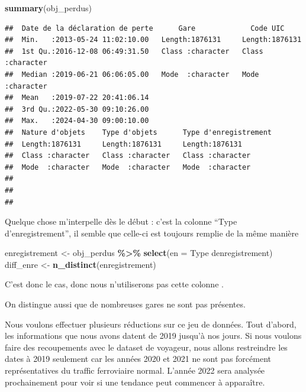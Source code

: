 \documentclass[
]{article}
\newenvironment{Shaded}{\begin{snugshade}}{\end{snugshade}}
\newcommand{\AttributeTok}[1]{\textcolor[rgb]{0.13,0.29,0.53}{#1}}
\newcommand{\FunctionTok}[1]{\textcolor[rgb]{0.13,0.29,0.53}{\textbf{#1}}}
\newcommand{\NormalTok}[1]{#1}
\newcommand{\OtherTok}[1]{\textcolor[rgb]{0.56,0.35,0.01}{#1}}
\newcommand{\SpecialCharTok}[1]{\textcolor[rgb]{0.81,0.36,0.00}{\textbf{#1}}}
\newcommand{\StringTok}[1]{\textcolor[rgb]{0.31,0.60,0.02}{#1}}
\begin{document}
\begin{Shaded}
\begin{Highlighting}[]
\FunctionTok{summary}\NormalTok{(obj\_perdus)}
\end{Highlighting}
\end{Shaded}

\begin{verbatim}
##  Date de la déclaration de perte      Gare             Code UIC        
##  Min.   :2013-05-24 11:02:10.00   Length:1876131     Length:1876131    
##  1st Qu.:2016-12-08 06:49:31.50   Class :character   Class :character  
##  Median :2019-06-21 06:06:05.00   Mode  :character   Mode  :character  
##  Mean   :2019-07-22 20:41:06.14                                        
##  3rd Qu.:2022-05-30 09:10:26.00                                        
##  Max.   :2024-04-30 09:00:10.00                                        
##  Nature d'objets    Type d'objets      Type d'enregistrement
##  Length:1876131     Length:1876131     Length:1876131       
##  Class :character   Class :character   Class :character     
##  Mode  :character   Mode  :character   Mode  :character     
##                                                             
##                                                             
## 
\end{verbatim}

Quelque chose m'interpelle dès le début : c'est la colonne ``Type
d'enregistrement'', il semble que celle-ci est toujours remplie de la
même manière

\begin{Shaded}
\begin{Highlighting}[]
\NormalTok{enregistrement }\OtherTok{\textless{}{-}}\NormalTok{ obj\_perdus }\SpecialCharTok{\%\textgreater{}\%}
  \FunctionTok{select}\NormalTok{(}\AttributeTok{en =} \StringTok{\textasciigrave{}}\AttributeTok{Type d\textquotesingle{}enregistrement}\StringTok{\textasciigrave{}}\NormalTok{)}
\NormalTok{diff\_enre }\OtherTok{\textless{}{-}} \FunctionTok{n\_distinct}\NormalTok{(enregistrement)}
\end{Highlighting}
\end{Shaded}

C'est donc le cas, donc nous n'utiliserons pas cette colonne .

On distingue aussi que de nombreuses gares ne sont pas présentes.

Nous voulons effectuer plusieurs réductions sur ce jeu de données. Tout
d'abord, les informations que nous avons datent de 2019 jusqu'à nos
jours. Si nous voulons faire des recoupements avec le dataset de
voyageur, nous allons restreindre les dates à 2019 seulement car les
années 2020 et 2021 ne sont pas forcément représentatives du traffic
ferroviaire normal. L'année 2022 sera analysée prochainement pour voir
si une tendance peut commencer à apparaître.
\end{document}
